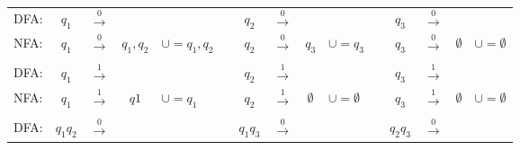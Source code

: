 \documentclass[
	final,
	a4paper,
	oneside,
	parskip=full,
	headings=standardclasses,
	headings=big,
	pointednumbers
]{scrartcl}
\begin{document}
    \begin{tabular}{l|ccc|ll|ccc|ll|ccc|l}
            \multicolumn{1}{c}{DFA:} & $q_1$    & $\xrightarrow{0}$ & \multicolumn{1}{c}{} & & 
            \multicolumn{1}{c}{}     & $q_2$    & $\xrightarrow{0}$ & \multicolumn{1}{c}{} & & 
            \multicolumn{1}{c}{}     & $q_3$    & $\xrightarrow{0}$ & \multicolumn{1}{c}{} &
        \\  
            \cline{2-4} \cline{7-9} \cline{12-14}
            NFA:                     & $q_1$   & $\xrightarrow{0}$  & $q_1,q_2$   & $\cup = q_1,q_2 $    &
                                     & $q_2$   & $\xrightarrow{0}$  & $q_3$       & $\cup = q_3$         &
                                     & $q_3$   & $\xrightarrow{0}$  & $\emptyset$ & $\cup = \emptyset$
        \\
            \cline{2-4} \cline{7-9} \cline{12-14}
            \multicolumn{1}{c}{} & & & \multicolumn{1}{c}{} & &
            \multicolumn{1}{c}{} & & & \multicolumn{1}{c}{} & &
            \multicolumn{1}{c}{} & & & \multicolumn{1}{c}{} &
        \\
            \multicolumn{1}{c}{DFA:} & $q_1$    & $\xrightarrow{1}$ & \multicolumn{1}{c}{} & & 
            \multicolumn{1}{c}{}     & $q_2$    & $\xrightarrow{1}$ & \multicolumn{1}{c}{} & & 
            \multicolumn{1}{c}{}     & $q_3$    & $\xrightarrow{1}$ & \multicolumn{1}{c}{} &
        \\  
            \cline{2-4} \cline{7-9} \cline{12-14}
            NFA:                     & $q_1$    & $\xrightarrow{1}$ & $q1$        & $\cup = q_1$          &
                                     & $q_2$    & $\xrightarrow{1}$ & $\emptyset$ & $\cup = \emptyset$  &
                                     & $q_3$    & $\xrightarrow{1}$ & $\emptyset$ & $\cup = \emptyset$
        \\
            \cline{2-4} \cline{7-9} \cline{12-14}
            \multicolumn{1}{c}{} & & & \multicolumn{1}{c}{} & &
            \multicolumn{1}{c}{} & & & \multicolumn{1}{c}{} & &
            \multicolumn{1}{c}{} & & & \multicolumn{1}{c}{} &
        \\
            \multicolumn{1}{c}{DFA:} & $q_1q_2$ & $\xrightarrow{0}$ & \multicolumn{1}{c}{} & & 
            \multicolumn{1}{c}{}     & $q_1q_3$ & $\xrightarrow{0}$ & \multicolumn{1}{c}{} & & 
            \multicolumn{1}{c}{}     & $q_2q_3$ & $\xrightarrow{0}$ & \multicolumn{1}{c}{} &
        \\  

\end{tabular}
\end{document}
